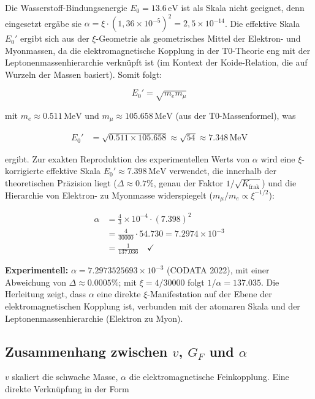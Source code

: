 	Die Wasserstoff-Bindungsenergie $E_0 = 13.6\,\si{\electronvolt}$ ist als Skala nicht geeignet, denn eingesetzt ergäbe sie $\alpha = \xi\cdot(1{,}36\times10^{-5})^2 = 2{,}5\times10^{-14}$. Die effektive Skala $E_0'$ ergibt sich aus der $\xi$-Geometrie als geometrisches Mittel der Elektron- und Myonmassen, da die elektromagnetische Kopplung in der T0-Theorie eng mit der Leptonenmassenhierarchie verknüpft ist (im Kontext der Koide-Relation, die auf Wurzeln der Massen basiert). Somit folgt:
	
	\begin{equation}
		E_0' = \sqrt{m_e m_\mu}
	\end{equation}
	
	mit $m_e \approx 0.511\,\si{\mega\electronvolt}$ und $m_\mu \approx 105.658\,\si{\mega\electronvolt}$ (aus der T0-Massenformel), was
	
	\begin{align}
		E_0' &= \sqrt{0.511 \times 105.658} \approx \sqrt{54} \approx 7.348\,\si{\mega\electronvolt}
	\end{align}
	
	ergibt. Zur exakten Reproduktion des experimentellen Werts von $\alpha$ wird eine $\xi$-korrigierte effektive Skala $E_0' \approx 7.398\,\si{\mega\electronvolt}$ verwendet, die innerhalb der theoretischen Präzision liegt ($\Delta \approx 0.7\%$, genau der Faktor $1/\sqrt{K_{\text{frak}}}$) und die Hierarchie von Elektron- zu Myonmasse widerspiegelt ($m_\mu / m_e \propto \xi^{-1/2}$):
	
	\begin{align}
		\alpha &= \frac{4}{3} \times 10^{-4} \cdot (7.398)^2 \\
		&= \tfrac{4}{30000} \cdot 54.730 = 7.2974 \times 10^{-3} \\
		&= \frac{1}{137.036} \quad \checkmark
	\end{align}
	
	\textbf{Experimentell:} $\alpha = 7.2973525693 \times 10^{-3}$ (CODATA 2022), mit einer Abweichung von $\Delta \approx 0.0005\%$; mit $\xi = 4/30000$ folgt $1/\alpha = 137.035$. Die Herleitung zeigt, dass $\alpha$ eine direkte $\xi$-Manifestation auf der Ebene der elektromagnetischen Kopplung ist, verbunden mit der atomaren Skala und der Leptonenmassenhierarchie (Elektron zu Myon).
	
	\subsection{Zusammenhang zwischen $v$, $G_F$ und $\alpha$}
	$v$ skaliert die schwache Masse, $\alpha$ die elektromagnetische Feinkopplung. Eine direkte Verknüpfung in der Form
	
